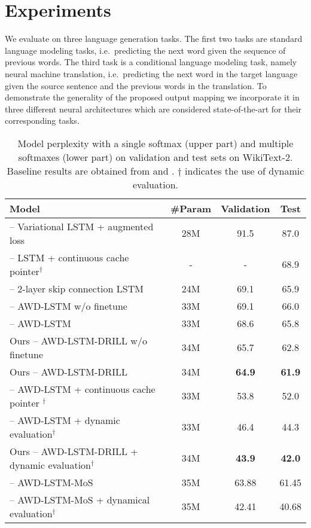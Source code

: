 \documentclass{article}
\begin{document}
\section{Experiments}
\label{eval}

We evaluate on three language generation tasks.  The first two tasks are standard language modeling tasks, i.e.~predicting the next word given the sequence of previous words.  The third task is a conditional language modeling task, namely neural machine translation, i.e.~predicting the next word in the target language given the source sentence and the previous words in the translation.  To demonstrate the generality of the proposed output mapping we incorporate it in three different neural architectures which are considered state-of-the-art for their corresponding tasks.

\begin{table*}[t]\small
	\centering
	\begin{tabular}{l|ccc}
		\toprule
		\bf Model & \bf \#Param & \bf Validation &  \bf Test \\
		\midrule
		\citet{inan2016tying} -- Variational LSTM  + augmented loss & 28M & 91.5 & 87.0 \\
		\citet{grave2016improving} -- LSTM + continuous cache pointer$^\dagger$ & - & - & 68.9 \\
		\citet{melis2017state} -- 2-layer skip connection LSTM & 24M & 69.1 & 65.9 \\
		\midrule
		\citet{merity2017regularizing} -- AWD-LSTM w/o finetune & 33M & 69.1 & 66.0 \\
		\citet{merity2017regularizing} -- AWD-LSTM & 33M & 68.6 & 65.8 \\
		Ours -- AWD-LSTM-DRILL w/o finetune & 34M & {65.7}  & {62.8}  \\ Ours -- AWD-LSTM-DRILL  & 34M & \textbf{64.9}  & \textbf{61.9}  \\ \midrule
		\citet{merity2017regularizing} -- AWD-LSTM + continuous cache pointer $^\dagger$& 33M & 53.8 & 52.0 \\
		\citet{krause2017dynamic} -- AWD-LSTM + dynamic evaluation$^\dagger$ & 33M & 46.4 & 44.3 \\
		Ours -- AWD-LSTM-DRILL + dynamic evaluation$^\dagger$ & 34M & \textbf{43.9} &  \textbf{42.0}  \\
		\midrule \midrule
		\citet{mos2018} -- AWD-LSTM-MoS & 35M & {63.88} & {61.45} \\
		\citet{mos2018} -- AWD-LSTM-MoS + dynamical evaluation$^\dagger$ & 35M & {42.41} & {40.68} \\
		\bottomrule
	\end{tabular}
	\vspace{-1mm}
	\caption{\small 
		Model perplexity with a single softmax (upper part) and multiple softmaxes (lower part) on validation and test sets on WikiText-2. Baseline results are obtained from \citet{merity2017regularizing} and \citet{krause2017dynamic}. $\dagger$ indicates the use of dynamic evaluation.
	}
	\vspace{-4mm}
	\label{table:WT2}
\end{table*}
 
\end{document}
